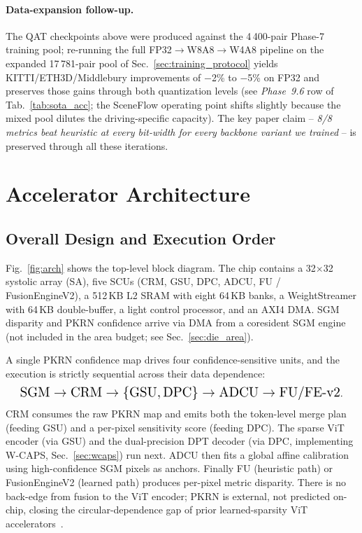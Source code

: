 \documentclass[journal]{IEEEtran}
\begin{document}
\paragraph{Data-expansion follow-up.} The QAT checkpoints above were produced against the 4\,400-pair Phase-7 training pool; re-running the full FP32$\to$W8A8$\to$W4A8 pipeline on the expanded 17\,781-pair pool of Sec.~\ref{sec:training_protocol} yields KITTI/ETH3D/Middlebury improvements of $-$2\% to $-$5\% on FP32 and preserves those gains through both quantization levels (see \emph{Phase~9.6} row of Tab.~\ref{tab:sota_acc}; the SceneFlow operating point shifts slightly because the mixed pool dilutes the driving-specific capacity). The key paper claim -- \emph{8/8 metrics beat heuristic at every bit-width for every backbone variant we trained} -- is preserved through all these iterations.

\section{Accelerator Architecture}
\label{sec:arch}

\subsection{Overall Design and Execution Order}
\label{sec:arch_overview}
Fig.~\ref{fig:arch} shows the top-level block diagram. The chip contains a 32$\times$32 systolic array (SA), five SCUs (CRM, GSU, DPC, ADCU, FU / FusionEngineV2), a 512\,KB L2 SRAM with eight 64\,KB banks, a WeightStreamer with 64\,KB double-buffer, a light control processor, and an AXI4 DMA. SGM disparity and PKRN confidence arrive via DMA from a coresident SGM engine (not included in the area budget; see Sec.~\ref{sec:die_area}).

A single PKRN confidence map drives four confidence-sensitive units, and the execution is strictly sequential across their data dependence:
\begin{equation}
\label{eq:order}
\resizebox{0.95\columnwidth}{!}{$
\mathrm{SGM} \to \mathrm{CRM} \to \{\mathrm{GSU}, \mathrm{DPC}\} \to \mathrm{ADCU} \to \mathrm{FU}/\mathrm{FE\mbox{-}v2}
$}.
\end{equation}
CRM consumes the raw PKRN map and emits both the token-level merge plan (feeding GSU) and a per-pixel sensitivity score (feeding DPC). The sparse ViT encoder (via GSU) and the dual-precision DPT decoder (via DPC, implementing W-CAPS, Sec.~\ref{sec:wcaps}) run next. ADCU then fits a global affine calibration using high-confidence SGM pixels as anchors. Finally FU (heuristic path) or FusionEngineV2 (learned path) produces per-pixel metric disparity. There is no back-edge from fusion to the ViT encoder; PKRN is external, not predicted on-chip, closing the circular-dependence gap of prior learned-sparsity ViT accelerators~\cite{you2023vitcod,wang2021spatten}.
\end{document}
